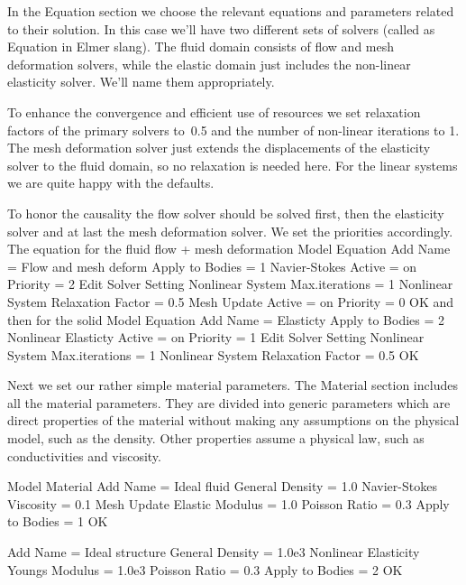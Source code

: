 In the Equation section we choose the relevant equations and parameters related to their solution. 
In this case we'll have two different sets of solvers (called as Equation in Elmer slang). 
The fluid domain consists of flow and mesh deformation solvers, while the 
elastic domain just includes the non-linear elasticity solver. We'll name them appropriately. 

To enhance the convergence and efficient use of resources 
we set relaxation factors of the primary solvers to~0.5 and the 
number of non-linear iterations to 1. The mesh deformation solver just extends the 
displacements of the elasticity solver to the fluid domain, so no relaxation is needed here. 
For the linear systems we are quite happy with the defaults.

To honor the causality the flow solver should be solved first, then the elasticity solver and
at last the mesh deformation solver. We set the priorities accordingly. 
\\
\noindent
The equation for the fluid flow + mesh deformation
\ttbegin
Model
  Equation
    Add
    Name = Flow and mesh deform
    Apply to Bodies = 1
    Navier-Stokes
      Active = on
      Priority = 2 
      Edit Solver Setting
        Nonlinear System
          Max.iterations = 1
          Nonlinear System Relaxation Factor = 0.5
    Mesh Update
      Active = on
      Priority = 0 
    OK
\ttend        
and then for the solid
\ttbegin
Model
  Equation
    Add
    Name = Elasticty
    Apply to Bodies = 2
    Nonlinear Elasticty
      Active = on
      Priority = 1
      Edit Solver Setting
        Nonlinear System
          Max.iterations = 1
          Nonlinear System Relaxation Factor = 0.5
    OK
\ttend    

Next we set our rather simple material parameters.
The Material section includes all the material parameters.
They are divided into generic parameters which are direct properties of the material
without making any assumptions on the physical model, such as the density. Other properties assume
a physical law, such as conductivities and viscosity. 

\ttbegin
Model
  Material
    Add
    Name = Ideal fluid 
    General 
      Density = 1.0
    Navier-Stokes
      Viscosity = 0.1
    Mesh Update
      Elastic Modulus = 1.0
      Poisson Ratio = 0.3  
    Apply to Bodies = 1 
    OK

    Add  
    Name = Ideal structure
    General 
      Density = 1.0e3
    Nonlinear Elasticity
      Youngs Modulus = 1.0e3
      Poisson Ratio = 0.3
    Apply to Bodies = 2
    OK
\ttend

